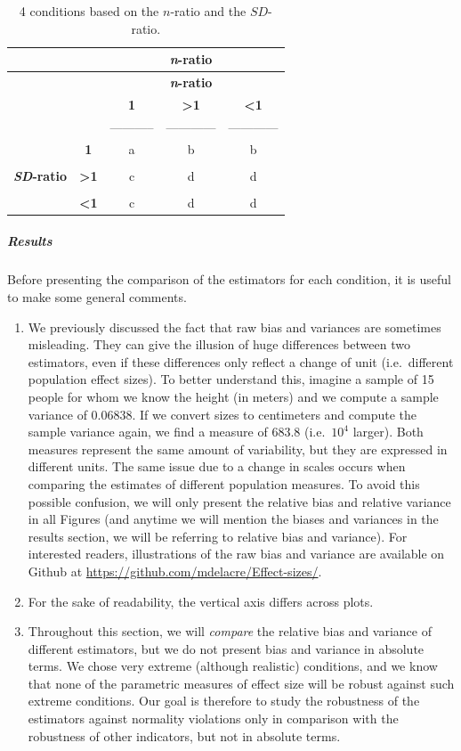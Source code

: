 \documentclass[
  english,
  man]{apa6}
\let\oldsubparagraph\subparagraph
\renewcommand{\subparagraph}[1]{\oldsubparagraph{#1}\mbox{}}
\begin{document}
\begin{longtable}[]{@{}ccccc@{}}
\caption{4 conditions based on the \(n\)-ratio and the \(SD\)-ratio.}\tabularnewline
\toprule
& & & \textbf{\emph{n}-ratio} & \\
\midrule
\endfirsthead
\toprule
& & & \textbf{\emph{n}-ratio} & \\
\midrule
\endhead
& & \textbf{1} & \textbf{\textgreater1} & \textbf{\textless1} \\
& & ----------- & ------------ & ------------ \\
& \textbf{1} & a & b & b \\
& & & & \\
\textbf{\emph{SD}-ratio} & \textbf{\textgreater1} & c & d & d \\
& & & & \\
& \textbf{\textless1} & c & d & d \\
\bottomrule
\end{longtable}

\hypertarget{results}{%
\subparagraph{Results}\label{results}}

Before presenting the comparison of the estimators for each condition, it is useful to make some general comments.

\begin{enumerate}
\def\labelenumi{\arabic{enumi})}
\item
  We previously discussed the fact that raw bias and variances are sometimes misleading. They can give the illusion of huge differences between two estimators, even if these differences only reflect a change of unit (i.e.~different population effect sizes). To better understand this, imagine a sample of 15 people for whom we know the height (in meters) and we compute a sample variance of 0.06838. If we convert sizes to centimeters and compute the sample variance again, we find a measure of 683.8 (i.e.~\(10^4\) larger). Both measures represent the same amount of variability, but they are expressed in different units. The same issue due to a change in scales occurs when comparing the estimates of different population measures. To avoid this possible confusion, we will only present the relative bias and relative variance in all Figures (and anytime we will mention the biases and variances in the results section, we will be referring to relative bias and variance). For interested readers, illustrations of the raw bias and variance are available on Github at \url{https://github.com/mdelacre/Effect-sizes/}.
\item
  For the sake of readability, the vertical axis differs across plots.
\item
  Throughout this section, we will \emph{compare} the relative bias and variance of different estimators, but we do not present bias and variance in absolute terms. We chose very extreme (although realistic) conditions, and we know that none of the parametric measures of effect size will be robust against such extreme conditions. Our goal is therefore to study the robustness of the estimators against normality violations only in comparison with the robustness of other indicators, but not in absolute terms.
\end{enumerate}
\end{document}
